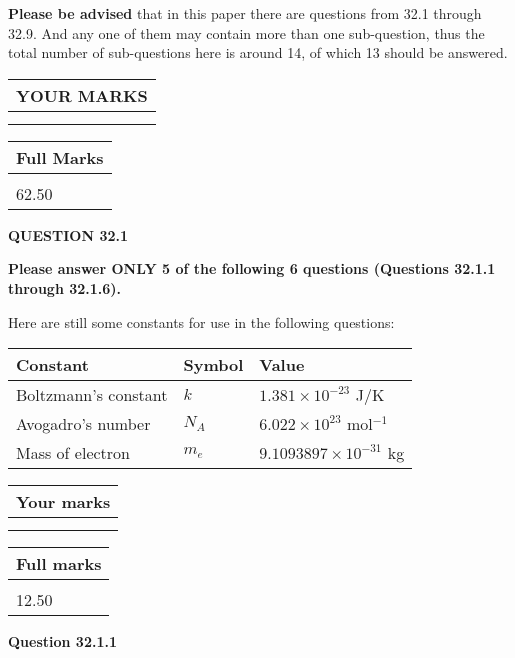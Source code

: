 \documentclass[12pt]{article}
\begin{document}
 
{\textbf{\large{Please be advised}}} that in this paper there are questions from
32.1 through
32.9.
And any one of them may contain more than one sub-question, thus the total number
of sub-questions here is around 14, of which
13 should be answered.
 
\vspace{0.3in}
 
 
   
   
  
\vspace{0.2in}
  
\noindent\begin{tabular}{|l|}
\hline
 YOUR MARKS  \\
\hline
 \\ 
 \\ 
\hline
\end{tabular}
\hspace{0.05in} \begin{tabular}{|l|}
\hline
 Full Marks  \\
\hline
 \\ 
62.50 \\
\hline
\end{tabular}
{\textbf{\Large{QUESTION
32.1 
}}}
  
  
 
{\textbf{\Large{Please answer ONLY
5 of the following
6 questions (Questions
32.1.1 through
32.1.6). }}}
 
Here are still some constants for use in the following questions:
 
 
\noindent\begin{tabular}{|l|l|l|}
\hline
Constant & Symbol & Value \\
\hline
 
Boltzmann's constant &
$k$ &
 $ 1.381 \times 10^{-23} $
J/K \\
\hline
 
Avogadro's number &
$N_A$ &
 $ 6.022 \times 10^{23} $
mol$^{-1}$ \\
\hline
 
Mass of electron &
$m_e$ &
 $ 9.1093897 \times 10^{-31} $
kg \\
\hline
 
\end{tabular}
 
  
\vspace{0.2in}
  
         \begin{tabular}{|l|}
\hline
 Your marks  \\
\hline
 \\ 
 \\ 
\hline
\end{tabular}
\hspace{0.05in} \begin{tabular}{|l|}
\hline
 Full marks  \\
\hline
 \\ 
12.50 \\
\hline
\end{tabular}
{\textbf{\Large{Question
32.1.1 
}}}
  
\end{document}
